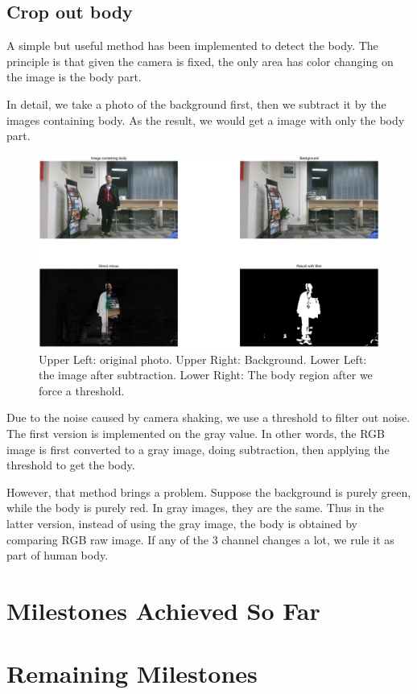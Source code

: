 \documentclass[conference,compsoc]{IEEEtran}
\begin{document}
\subsection{Crop out body}
\par
A simple but useful method has been implemented to detect the body. The principle is that given the camera is fixed, the only area has color changing on the image is the body part.
\par
In detail, we take a photo of the background first, then we subtract it by the images containing body. As the result, we would get a image with only the body part.
\begin{figure}[h]
	\centering
	\includegraphics[width=\linewidth]{./Pic/CropBody.png}
	\caption{Upper Left: original photo. Upper Right: Background. Lower Left: the image after subtraction. Lower Right: The body region after we force a threshold.}
\end{figure}
\par
Due to the noise caused by camera shaking, we use a threshold to filter out noise. The first version is implemented on the gray value. In other words, the RGB image is first converted to a gray image, doing subtraction, then applying the threshold to get the body.
\par
However, that method brings a problem. Suppose the background is purely green, while the body is purely red. 
In gray images, they are the same. Thus in the latter version, instead of using the gray image, the body is obtained by comparing RGB raw image. If any of the 3 channel changes a lot, we rule it as part of human body.

\section{Milestones Achieved So Far}

\section{Remaining Milestones}


% 
% 
\end{document}
